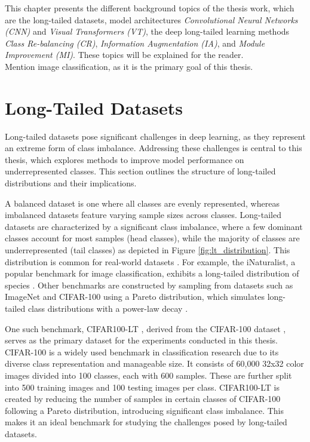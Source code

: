 

This chapter presents the different background topics of the thesis work, which are the long-tailed datasets, model architectures \textit{Convolutional Neural Networks (CNN)} and \textit{Visual Transformers (VT)}, the deep long-tailed learning methods \textit{Class Re-balancing (CR)}, \textit{Information Augmentation (IA)}, 
and \textit{Module Improvement (MI)}. These topics will be explained for the reader.\\

Mention image classification, as it is the primary goal of this thesis. 

\section{Long-Tailed Datasets}
Long-tailed datasets pose significant challenges in deep learning, as they represent an extreme form of class imbalance. Addressing these challenges is central to this thesis, which explores methods to improve model performance on underrepresented classes. This section outlines the structure of long-tailed distributions and their implications.

A balanced dataset is one where all classes are evenly represented, whereas imbalanced datasets feature varying sample sizes across classes. Long-tailed datasets are characterized by a significant class imbalance, where a few dominant classes account for most samples (head classes), while the majority of classes are underrepresented (tail classes) as depicted in Figure \ref{fig:lt_distribution}. This  distribution is common for real-world datasets \cite{Newman_2005, liu2019largescalelongtailedrecognitionopen}. For example, the iNaturalist, a popular benchmark for image classification, exhibits a long-tailed distribution of species \cite{vanhorn2018inaturalistspeciesclassificationdetection}. Other benchmarks are constructed by sampling from datasets such as ImageNet \cite{ImageNet2009} and CIFAR-100 \cite{krizhevsky2009learning} using a Pareto distribution, which simulates long-tailed class distributions with a power-law decay \cite{zhang2023deep, dealvis2024surveydeeplongtailclassification,cao2019learningimbalanceddatasetslabeldistributionaware}.

One such benchmark, CIFAR100-LT \cite{cao2019learningimbalanceddatasetslabeldistributionaware}, derived from the CIFAR-100 dataset \cite{krizhevsky2009learning}, serves as the primary dataset for the experiments conducted in this thesis. CIFAR-100 is a widely used benchmark in classification research due to its diverse class representation and manageable size. It consists of 60,000 32x32 color images divided into 100 classes, each with 600 samples. These are further split into 500 training images and 100 testing images per class. CIFAR100-LT is created by reducing the number of samples in certain classes of CIFAR-100 following a Pareto distribution, introducing significant class imbalance. This makes it an ideal benchmark for studying the challenges posed by long-tailed datasets.  

